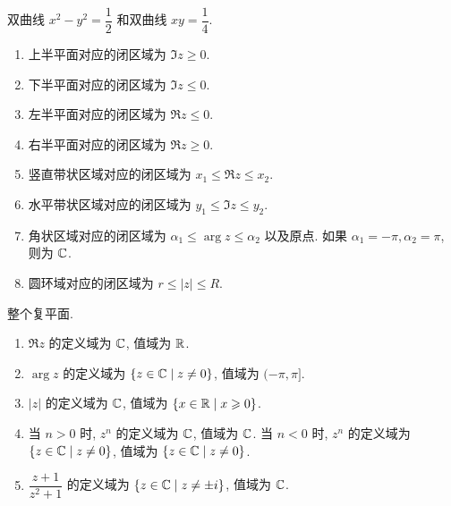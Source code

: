 \exans 双曲线 $x^2-y^2=\dfrac12$ 和双曲线 $xy=\dfrac14$.
\exans
\begin{enumerate}
	\item 上半平面对应的闭区域为 $\Im z\ge0$.
	\item 下半平面对应的闭区域为 $\Im z\le0$.
	\item 左半平面对应的闭区域为 $\Re z\le0$.
	\item 右半平面对应的闭区域为 $\Re z\ge0$.
	\item 竖直带状区域对应的闭区域为 $x_1\le\Re z\le x_2$.
	\item 水平带状区域对应的闭区域为 $y_1\le\Im z\le y_2$.
	\item 角状区域对应的闭区域为 $\alpha_1\le \arg z\le \alpha_2$ 以及原点. 如果 $\alpha_1=-\pi,\alpha_2=\pi$, 则为 ${\mathbb{C}}$.
	\item 圆环域对应的闭区域为 $r\le|z|\le R$.
\end{enumerate}
\exans 整个复平面.

\exans
\begin{enumerate}
	\item $\Re z$ 的定义域为 ${\mathbb{C}}$, 值域为 ${\mathbb{R}}$.
	\item $\arg z$ 的定义域为 $\{z\in{\mathbb{C}}\mid z\neq 0\}$, 值域为 $(-\pi,\pi]$.
	\item $|z|$ 的定义域为 ${\mathbb{C}}$, 值域为 $\{x\in{\mathbb{R}}\mid x\geqslant0\}$.
	\item 当 $n>0$ 时, $z^n$ 的定义域为 ${\mathbb{C}}$, 值域为 ${\mathbb{C}}$.
	当 $n<0$ 时, $z^n$ 的定义域为 $\{z\in{\mathbb{C}}\mid z\neq 0\}$, 值域为 $\{z\in{\mathbb{C}}\mid z\neq 0\}$.
	\item $\dfrac{z+1}{z^2+1}$ 的定义域为 $\{z\in{\mathbb{C}}\mid z\neq \pm i\}$, 值域为 ${\mathbb{C}}$.
\end{enumerate}
